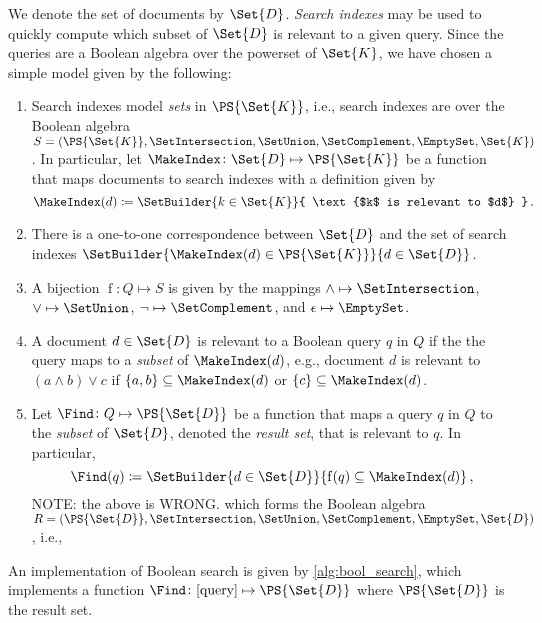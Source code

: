 \documentclass[ ../main.tex]{subfiles}
\begin{document}
We denote the set of documents by $\Set{D}$. \emph{Search indexes} may be used to quickly compute which subset of $\Set{D}$ is relevant to a given query.
Since the queries are a Boolean algebra over the powerset of $\Set{K}$, we have chosen a simple model given by the following:
\begin{enumerate}
\item Search indexes model \emph{sets} in $\PS{\Set{K}}$, i.e., search indexes are over the Boolean algebra $S = (\PS{\Set{K}}, \SetIntersection, \SetUnion, \SetComplement, \EmptySet, \Set{K})$. In particular, let $\MakeIndex \colon \Set{D} \mapsto \PS{\Set{K}}$ be a function that maps documents to search indexes with a definition given by
\begin{equation}
\MakeIndex(d) \coloneqq
\SetBuilder
{
	k \in \Set{K}
}
{
	\text{$k$ is relevant to $d$}
}\,.
\end{equation}
\item There is a one-to-one correspondence between $\Set{D}$ and the set of search indexes $\SetBuilder{\MakeIndex(d) \in \PS{\Set{K}}}{d \in \Set{D}}$.
\item A bijection $\operatorname{f} \colon Q \mapsto S$ is given by the mappings $\land \mapsto \SetIntersection$, $\lor \mapsto \SetUnion$, $\neg \mapsto \SetComplement$, and $\epsilon \mapsto \EmptySet$.
\item A document $d \in \Set{D}$ is relevant to a Boolean query $q$ in $Q$ if the the query maps to a \emph{subset} of $\MakeIndex(d)$, e.g., document $d$ is relevant to $(a \land b) \lor c$ if $\{a,b\} \subseteq \MakeIndex(d)$ or $\{c\} \subseteq \MakeIndex(d)$.
\item Let $\Find \colon Q \mapsto \PS{\Set{D}}$ be a function that maps a query $q$ in $Q$ to the \emph{subset} of $\Set{D}$, denoted the \emph{result set}, that is relevant to $q$. In particular,
\begin{equation}
	\Find(q) \coloneqq \SetBuilder{d \in \Set{D}}{\operatorname{f}(q) \subseteq \MakeIndex(d)}\,,
\end{equation}
NOTE: the above is WRONG.
which forms the Boolean algebra $R = (\PS{\Set{D}}, \SetIntersection, \SetUnion, \SetComplement, \EmptySet, \Set{D})$, i.e.,
\end{enumerate}


An implementation of Boolean search is given by \cref{alg:bool_search}, which implements a function $\Find \colon [\text{query}] \mapsto \PS{\Set{D}}$ where $\PS{\Set{D}}$ is the result set.
\end{document}

